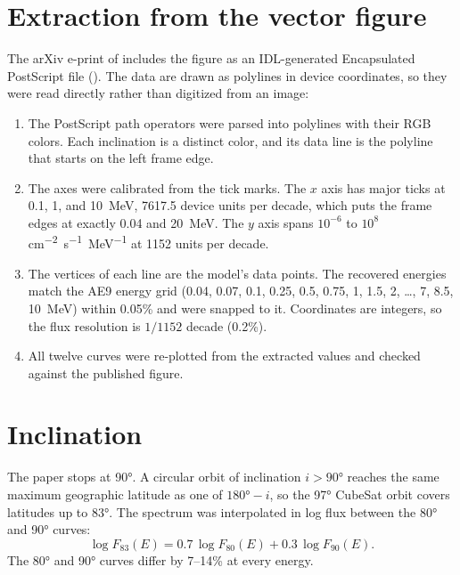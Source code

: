 \section{Extraction from the vector figure}
The arXiv e-print of \citet{ripa2020comparison} includes the figure as an IDL-generated Encapsulated PostScript file (). The data are drawn as polylines in device coordinates, so they were read directly rather than digitized from an image:
\begin{enumerate}
  \item The PostScript path operators were parsed into polylines with their RGB colors. Each inclination is a distinct color, and its data line is the polyline that starts on the left frame edge.
  \item The axes were calibrated from the tick marks. The $x$ axis has major ticks at 0.1, 1, and \SI{10}{MeV}, 7617.5 device units per decade, which puts the frame edges at exactly 0.04 and \SI{20}{MeV}. The $y$ axis spans $10^{-6}$ to $10^{8}$ \si{cm^{-2}.s^{-1}.MeV^{-1}} at 1152 units per decade.
  \item The vertices of each line are the model's data points. The recovered energies match the AE9 energy grid (0.04, 0.07, 0.1, 0.25, 0.5, 0.75, 1, 1.5, 2, \ldots, 7, 8.5, \SI{10}{MeV}) within 0.05\% and were snapped to it. Coordinates are integers, so the flux resolution is $1/1152$ decade (0.2\%).
  \item All twelve curves were re-plotted from the extracted values and checked against the published figure.
\end{enumerate}

\section{Inclination}
The paper stops at \ang{90}. A circular orbit of inclination $i>\ang{90}$ reaches the same maximum geographic latitude as one of $\ang{180}-i$, so the \ang{97} CubeSat orbit covers latitudes up to \ang{83}. The spectrum was interpolated in log flux between the \ang{80} and \ang{90} curves:
\begin{equation}
  \log F_{83}(E) = 0.7\,\log F_{80}(E) + 0.3\,\log F_{90}(E).
\end{equation}
The \ang{80} and \ang{90} curves differ by 7--14\% at every energy.



